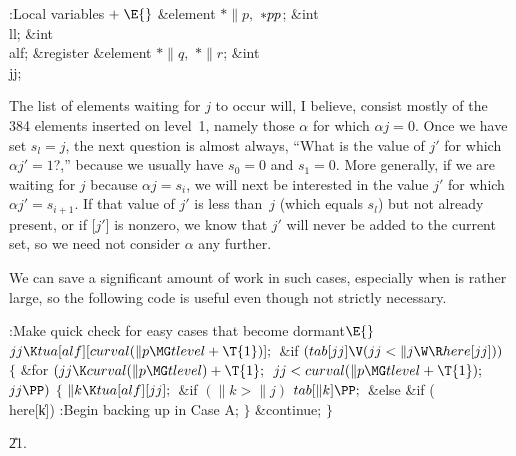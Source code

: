 \B{}:Local variables\X${}\mathrel+\E{}$\6
\&{element} ${}{*}\|p,{}$ ${}{*}\\{pp}{}$;\6
\&{int} \\{ll};\6
\&{int} \\{alf};\6
\&{register} \&{element} ${}{*}\|q,{}$ ${}{*}\|r{}$;\6
\&{int} \\{jj};\par
\fi

The list of elements waiting for $j$ to occur will, I believe, consist
mostly of the 384 elements inserted on level~1, namely those $\alpha$ for which
$\alpha j=0$. Once we have set $s_l=j$, the next question is almost
always, ``What is the value of $j'$ for which $\alpha j'=1$?,'' because
we usually have $s_0=0$ and $s_1=0$. More generally, if we are waiting
for $j$ because $\alpha j=s_i$, we will next be interested in the
value $j'$ for which $\alpha j'=s_{i+1}$. If that value of $j'$ is
less than~$j$ (which equals $s_l$) but not already present,
or if [$j'$] is nonzero,
we know that $j'$ will never be added to the current set, so we need not
consider $\alpha$ any further.

We can save a significant amount of work in such cases,
especially when  is rather large, so the following code is
useful even though not strictly necessary.

\Y\B\4:Make quick check for easy cases that become dormant\X${}\E{}$\6
$\\{jj}\K\\{tua}[\\{alf}][\\{curval}(\|p\MG\\{tlevel}+\T{1})];{}$\6
\&{if} ${}(\\{tab}[\\{jj}]\V(\\{jj}<\|j\W\R\\{here}[\\{jj}])){}$\5
${}\{{}$\1\6
\&{for} ${}(\\{jj}\K\\{curval}(\|p\MG\\{tlevel})+\T{1};{}$ ${}\\{jj}<%
\\{curval}(\|p\MG\\{tlevel}+\T{1});{}$ ${}\\{jj}\PP){}$\5
${}\{{}$\1\6
${}\|k\K\\{tua}[\\{alf}][\\{jj}];{}$\6
\&{if} ${}(\|k>\|j){}$\1\5
${}\\{tab}[\|k]\PP;{}$\2\6
\&{else} \&{if} (\\{here}[\|k])\1\5
:Begin backing up in Case A\X;\2\6
\4${}\}{}$\2\6
\&{continue};\6
\4${}\}{}$\2\par
\U21.\fi

